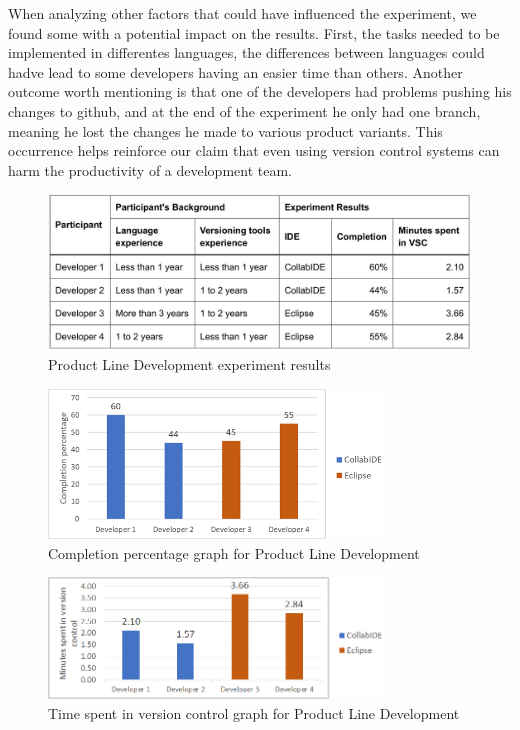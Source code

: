 When analyzing other factors that could have influenced the experiment, we found some with a potential impact on the results. First, the tasks needed to be implemented in differentes languages, the differences between languages could hadve lead to some developers having an easier time than others. Another outcome worth mentioning is that one of the developers had problems pushing his changes to github, and at the end of the experiment he only had one branch, meaning he lost the changes he made to various product variants. This occurrence helps reinforce our claim that even using version control systems can harm the productivity of a development team.   
\begin{figure}[htbp]
  \centering
  \includegraphics[width=1\textwidth]{img/resultsTableProductLine}
  \caption{Product Line Development experiment results}
  \label{fig:resultsTableProductLine}
\end{figure}

\begin{figure}[htbp]
  \centering
  \includegraphics[width=0.8\textwidth]{img/completionProductLine}
  \caption{Completion percentage graph for Product Line Development}
  \label{fig:completionProductLine}
\end{figure}

\begin{figure}[htbp]
  \centering
  \includegraphics[width=0.8\textwidth]{img/versionControlProductLine}
  \caption{Time spent in version control graph for Product Line Development}
  \label{fig:versionControlProductLine}
\end{figure}

